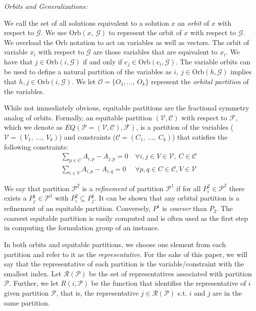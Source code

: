 \documentclass[runningheads]{llncs}
\newcommand{\cP}{{\mathcal P}}
\newcommand{\cF}{{\mathcal F}}
\newcommand{\cG}{{\mathcal G}}
\newcommand{\cO}{{\mathcal O}}
\newcommand{\cC}{{\mathcal C}}
\newcommand{\cV}{{\mathcal V}}
\newcommand{\cR}{{\mathcal R}}
\begin{document}
{\em Orbits and Generalizations:}


We call the set of all solutions equivalent to a
solution $x$ an {\em orbit} of $x$ with respect to $\cG$. We use
$\mbox{Orb}(x,\ \cG)$ to represent the orbit of $x$ with respect to $\cG$. We
overload the $\mbox{Orb}$ notation to act on variables as well as vectors. The
orbit of variable $x_i$ with respect to $\cG$ are those variables that are
equivalent to $x_i$. We have that $j \in \mbox{Orb}(i,\cG)$ if and only if $e_j
\in \mbox{Orb}(e_i,\cG)$. The variable orbits can be used to define a natural
partition of the variables as $i,\ j \in \mbox{Orb}(h,\cG)$ implies that $h, j
\in \mbox{Orb}(i,\cG)$. We let $\cO= \{O_1,\ldots,\ O_k\}$ represent the {\em orbital partition} of the variables. 

While not immediately obvious, equitable partitions are the fractional symmetry analog of orbits. Formally, an equitable partition $(\cV, \cC)$ with respect to $\cF$, which we denote as $EQ(\cP = (\cV,\cC), \cF)$, is a partition of the variables ($\cV = (V_1,\ \ldots,\ V_k)$) and constraints ($\cC = (C_1,\ \ldots,\ C_k)$) that satisfies the following constraints:
\begin{align}
\sum_{p \in C} A_{i,p} - A_{j,p} = 0 & \ \forall i,j \in V \in \cV,\ C \in \cC\\
\sum_{i \in V} A_{i,p} - A_{i,q} = 0 & \ \forall p,q \in C \in \cC, V \in \cV 
\end{align}


We say that partition $\cP^2$ is a {\em refinement} of partition $\cP^1$ if for
all $P_i^2 \in \cP^2$ there exists a $P_j^1 \in \cP^1$ with $P_i^2 \subseteq
P_j^1$. It can be shown that any orbital partition is a refinement of an equitable partition. Conversely, $P^1$ is {\em coarser} than $P_2$. The coarsest equitable partition is easily computed and is often used as the first step in computing the formulation group of an instance. 

In both orbits and equitable partitions, we choose one element from each partition and refer to it as the {\em representative}. For the sake of this paper, we will say that the representative of each partition is the variable/constraint with the smallest index.  Let $\cR(\cP)$ be the set of representatives associated with partition $\cP$. Further, we let $R(i,\cP)$ be the function that identifies the representative of $i$ given partition $\cP$, that is, the representative $j \in \cR(\cP)$ s.t. $i$ and $j$ are in the same partition.
\end{document}
